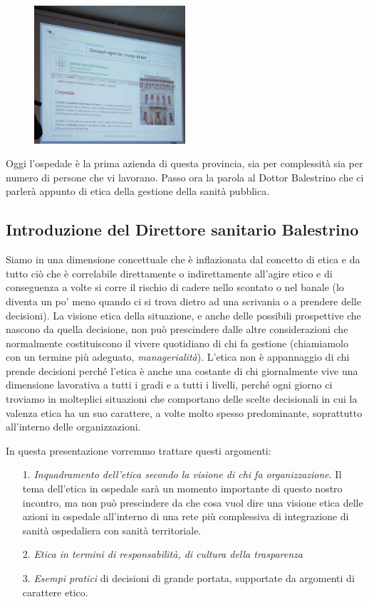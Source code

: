  \begin{figure}[!ht]
\centering
	\includegraphics[width=0.5\textwidth]{32/image2.jpeg}
	\end{figure}

Oggi l'ospedale è la prima azienda di questa provincia, sia per
complessità sia per numero di persone che vi lavorano. Passo ora la
parola al Dottor Balestrino che ci parlerà appunto di etica della
gestione della sanità pubblica.

\subsection{Introduzione del Direttore sanitario Balestrino}

Siamo in una dimensione concettuale che è inflazionata dal concetto di
etica e da tutto ciò che è correlabile direttamente o indirettamente
all'agire etico e di conseguenza a volte si corre il rischio di cadere
nello scontato o nel banale (lo diventa un po' meno quando ci si trova
dietro ad una scrivania o a prendere delle decisioni). La visione etica
della situazione, e anche delle possibili prospettive che nascono da
quella decisione, non può prescindere dalle altre considerazioni che
normalmente costituiscono il vivere quotidiano di chi fa gestione
(chiamiamolo con un termine più adeguato, \emph{managerialità}). L'etica
non è appannaggio di chi prende decisioni perché l'etica è anche una
costante di chi giornalmente vive una dimensione lavorativa a tutti i
gradi e a tutti i livelli, perché ogni giorno ci troviamo in molteplici
situazioni che comportano delle scelte decisionali in cui la valenza
etica ha un suo carattere, a volte molto spesso predominante,
soprattutto all'interno delle organizzazioni.

In questa presentazione vorremmo trattare questi argomenti:

\begin{itemize}
\item[1.]
  \emph{Inquadramento dell'etica secondo la visione di chi fa
  organizzazione}. Il tema dell'etica in ospedale sarà un momento
  importante di questo nostro incontro, ma non può prescindere da che
  cosa vuol dire una visione etica delle azioni in ospedale all'interno
  di una rete più complessiva di integrazione di sanità ospedaliera con
  sanità territoriale.
\item[2.]
  \emph{Etica in termini di responsabilità, di cultura della
  trasparenza}
\item[3.]
  \emph{Esempi pratici} di decisioni di grande portata, supportate da
  argomenti di carattere etico.
\end{itemize}

